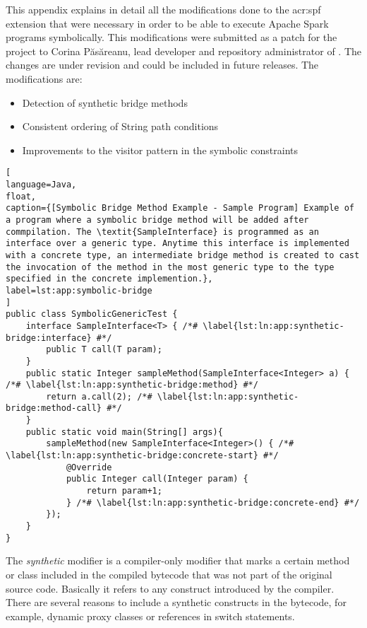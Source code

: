 \label{app:collaborations}

This appendix explains in detail all the modifications done to the \acrfull{acr:spf} extension that were necessary in order to be able to execute Apache Spark programs symbolically. This modifications were submitted as a patch for the \spf{} project to Corina Păsăreanu, lead developer and repository administrator of \spf{}. The changes are under revision and could be included in future releases. The modifications are:

\begin{itemize}
	\item Detection of synthetic bridge methods
	\item Consistent ordering of String path conditions
	\item Improvements to the visitor pattern in the symbolic constraints
\end{itemize}


\begin{lstlisting}[
language=Java,
float,
caption={[Symbolic Bridge Method Example - Sample Program] Example of a program where a symbolic bridge method will be added after commpilation. The \textit{SampleInterface} is programmed as an interface over a generic type. Anytime this interface is implemented with a concrete type, an intermediate bridge method is created to cast the invocation of the method in the most generic type to the type specified in the concrete implemention.},
label=lst:app:symbolic-bridge
]
public class SymbolicGenericTest {
	interface SampleInterface<T> { /*# \label{lst:ln:app:synthetic-bridge:interface} #*/
		public T call(T param); 
	}
	public static Integer sampleMethod(SampleInterface<Integer> a) { /*# \label{lst:ln:app:synthetic-bridge:method} #*/
		return a.call(2); /*# \label{lst:ln:app:synthetic-bridge:method-call} #*/
	}
	public static void main(String[] args){
		sampleMethod(new SampleInterface<Integer>() { /*# \label{lst:ln:app:synthetic-bridge:concrete-start} #*/
			@Override
			public Integer call(Integer param) {				
				return param+1;
			} /*# \label{lst:ln:app:synthetic-bridge:concrete-end} #*/
		});
	}
}
\end{lstlisting}

The \textit{synthetic} modifier is a compiler-only modifier that marks a certain method or class included in the compiled bytecode that was not part of the original source code. Basically it refers to any construct introduced by the compiler. There are several reasons to include a synthetic constructs in the bytecode, for example, dynamic proxy classes or references in switch statements.

